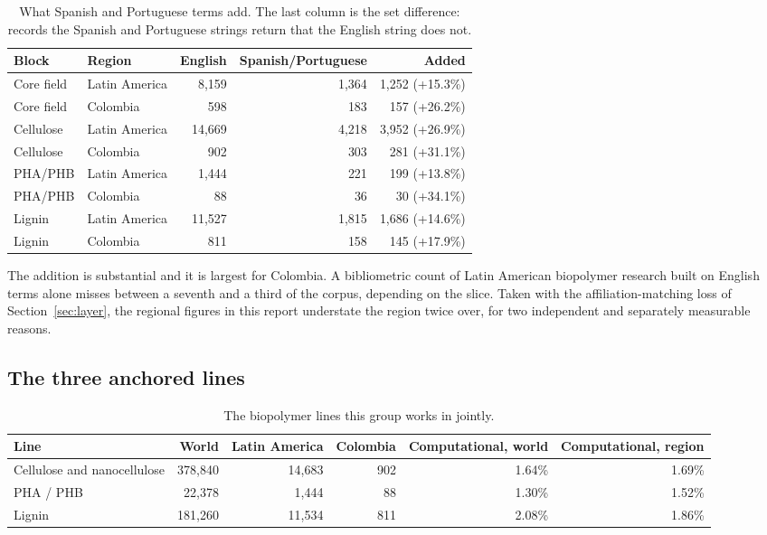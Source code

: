\documentclass[11pt,a4paper]{article}
\begin{document}
\begin{table}[htbp]
\centering
\caption{What Spanish and Portuguese terms add. The last column is the set difference:
records the Spanish and Portuguese strings return that the English string does not.}
\label{tab:language}
\small
\begin{tabular}{llrrr}
\toprule
Block & Region & English & Spanish/Portuguese & Added \\
\midrule
Core field & Latin America & 8,159 & 1,364 & 1,252 (+15.3\%) \\
Core field & Colombia & 598 & 183 & 157 (+26.2\%) \\
Cellulose & Latin America & 14,669 & 4,218 & 3,952 (+26.9\%) \\
Cellulose & Colombia & 902 & 303 & 281 (+31.1\%) \\
PHA/PHB & Latin America & 1,444 & 221 & 199 (+13.8\%) \\
PHA/PHB & Colombia & 88 & 36 & 30 (+34.1\%) \\
Lignin & Latin America & 11,527 & 1,815 & 1,686 (+14.6\%) \\
Lignin & Colombia & 811 & 158 & 145 (+17.9\%) \\
\bottomrule
\end{tabular}
\end{table}


The addition is substantial and it is largest for Colombia. A bibliometric count of Latin
American biopolymer research built on English terms alone misses between a seventh and a
third of the corpus, depending on the slice. Taken with the affiliation-matching loss of
Section~\ref{sec:layer}, the regional figures in this report understate the region twice
over, for two independent and separately measurable reasons.

\subsection{The three anchored lines}

\begin{table}[htbp]
\centering
\caption{The biopolymer lines this group works in jointly.}
\label{tab:anchors}
\small
\begin{tabular}{lrrrrr}
\toprule
Line & World & Latin America & Colombia & Computational, world & Computational, region \\
\midrule
Cellulose and nanocellulose & 378,840 & 14,683 & 902 & 1.64\% & 1.69\% \\
PHA / PHB & 22,378 & 1,444 & 88 & 1.30\% & 1.52\% \\
Lignin & 181,260 & 11,534 & 811 & 2.08\% & 1.86\% \\
\bottomrule
\end{tabular}
\end{table}
\end{document}
